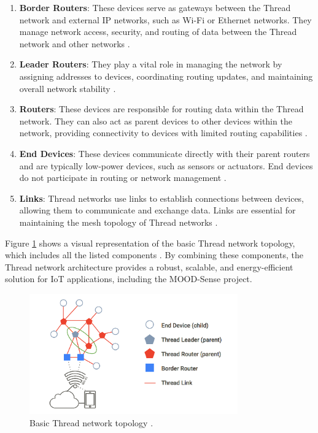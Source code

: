 \begin{enumerate}
    \item \textbf{Border Routers}: These devices serve as gateways between the Thread network and external \gls{IP} networks, such as Wi-Fi or Ethernet networks. They manage network access, security, and routing of data between the Thread network and other networks \cite{Thread_Group_Fundamentals}.
    \item \textbf{Leader Routers}: They play a vital role in managing the network by assigning addresses to devices, coordinating routing updates, and maintaining overall network stability \cite{Thread_Group_Fundamentals}.
    \item \textbf{Routers}: These devices are responsible for routing data within the Thread network. They can also act as parent devices to other devices within the network, providing connectivity to devices with limited routing capabilities \cite{Thread_Group_Fundamentals}.
    \item \textbf{End Devices}: These devices communicate directly with their parent routers and are typically low-power devices, such as sensors or actuators. End devices do not participate in routing or network management \cite{Thread_Group_Fundamentals}.
    \item \textbf{Links}: Thread networks use links to establish connections between devices, allowing them to communicate and exchange data. Links are essential for maintaining the mesh topology of Thread networks \cite{Thread_Group_Fundamentals}.
\end{enumerate}

Figure \ref{fig:thread_topology} shows a visual representation of the basic Thread network topology, which includes all the listed components \cite{Thread_Group_Fundamentals}. By combining these components, the Thread network architecture provides a robust, scalable, and energy-efficient solution for \gls{IoT} applications, including the MOOD-Sense project.

\begin{figure}[H]
    \centering
    \includegraphics[width=0.8\textwidth]{images/situational_theoretical_analysis/thread_topology.png}
    \caption{Basic Thread network topology \cite{Thread_Group_Fundamentals}.}
    \label{fig:thread_topology}
\end{figure}


